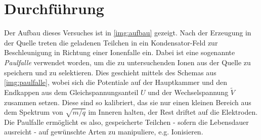 \documentclass[numbers=noenddot,a4paper,notitlepage,twoside,BCOR15mm]{scrartcl}
\newcommand{\tilt}[1]{\textit{#1}}
\begin{document}
	\newpage
	\section{Durchführung}

		Der Aufbau dieses Versuches ist in \autoref{img:aufbau} gezeigt. Nach der Erzeugung in der Quelle treten die geladenen Teilchen in ein Kondensator-Feld zur Beschleunigung in Richtung einer Ionenfalle ein. Dabei ist eine sogenannte \tilt{Paulfalle} verwendet worden, um die zu untersuchenden Ionen aus der Quelle zu speichern und zu selektieren. Dies geschieht mittels des Schemas aus \autoref{img:paulfalle}, wobei sich die Potentiale auf der Hauptkammer und den Endkappen aus dem Gleichspannungsanteil $U$ und der Wechselspannung $\tilde{V}$ zusammen setzen. Diese sind so kalibriert, das sie nur einen kleinen Bereich aus dem Spektrum von $\sqrt{m/q}$ im Inneren halten, der Rest driftet auf die Elektroden. Die Paulfalle ermöglicht es also, gespeicherte Teilchen - sofern die Lebensdauer ausreicht - auf gewünschte Arten zu manipuliere, e.g. Ionisieren.
\end{document}

